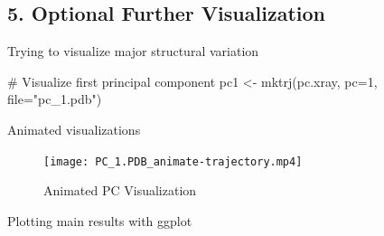 \documentclass[
  letterpaper,
  DIV=11,
  numbers=noendperiod]{scrartcl}
\newenvironment{Shaded}{\begin{snugshade}}{\end{snugshade}}
\newcommand{\AttributeTok}[1]{\textcolor[rgb]{0.40,0.45,0.13}{#1}}
\newcommand{\CommentTok}[1]{\textcolor[rgb]{0.37,0.37,0.37}{#1}}
\newcommand{\DecValTok}[1]{\textcolor[rgb]{0.68,0.00,0.00}{#1}}
\newcommand{\FunctionTok}[1]{\textcolor[rgb]{0.28,0.35,0.67}{#1}}
\newcommand{\NormalTok}[1]{\textcolor[rgb]{0.00,0.23,0.31}{#1}}
\newcommand{\OtherTok}[1]{\textcolor[rgb]{0.00,0.23,0.31}{#1}}
\newcommand{\SpecialCharTok}[1]{\textcolor[rgb]{0.37,0.37,0.37}{#1}}
\newcommand{\StringTok}[1]{\textcolor[rgb]{0.13,0.47,0.30}{#1}}
\begin{document}
\hypertarget{optional-further-visualization}{%
\subsection{5. Optional Further
Visualization}\label{optional-further-visualization}}

Trying to visualize major structural variation

\begin{Shaded}
\begin{Highlighting}[]
\CommentTok{\# Visualize first principal component}
\NormalTok{pc1 }\OtherTok{\textless{}{-}} \FunctionTok{mktrj}\NormalTok{(pc.xray, }\AttributeTok{pc=}\DecValTok{1}\NormalTok{, }\AttributeTok{file=}\StringTok{"pc\_1.pdb"}\NormalTok{)}
\end{Highlighting}
\end{Shaded}

Animated visualizations

\begin{figure}

{\centering \texttt{[image: PC\_1.PDB\_animate-trajectory.mp4]}

}

\caption{Animated PC Visualization}

\end{figure}

Plotting main results with ggplot

\begin{Shaded}
\end{Shaded}
\end{document}
